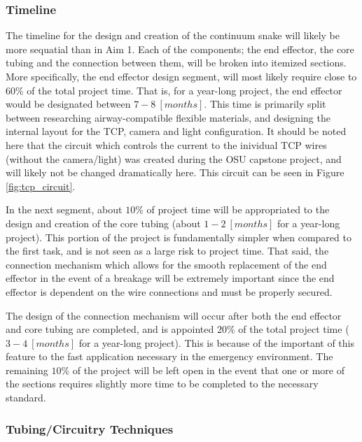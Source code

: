 	\subsubsection{Timeline}
	
		The timeline for the design and creation of the continuum snake will likely be more sequatial than in Aim 1. Each of the components; the end effector, the core tubing and the connection between them, will be broken into itemized sections. More specifically, the end effector design segment, will most likely require close to $60\%$ of the total project time. That is, for a year-long project, the end effector would be designated between $7-8\ [months]$. This time is primarily split between researching airway-compatible flexible materials, and designing the internal layout for the TCP, camera and light configuration. It should be noted here that the circuit which controls the current to the inividual TCP wires (without the camera/light) was created during the OSU capstone project, and will likely not be changed dramatically here. This circuit can be seen in Figure \ref{fig:tcp_circuit}.
		
		In the next segment, about $10\%$ of project time will be appropriated to the design and creation of the core tubing (about $1-2\ [months]$ for a year-long project). This portion of the project is fundamentally simpler when compared to the first task, and is not seen as a large risk to project time. That said, the connection mechanism which allows for the smooth replacement of the end effector in the event of a breakage will be extremely important since the end effector is dependent on the wire connections and must be properly secured.
		
		The design of the connection mechanism will occur after both the end effector and core tubing are completed, and is appointed $20\%$ of the total project time ($3-4\ [months]$ for a year-long project). This is because of the important of this feature to the fast application necessary in the emergency environment. The remaining $10\%$ of the project will be left open in the event that one or more of the sections requires slightly more time to be completed to the necessary standard.
	
	\subsubsection{Tubing/Circuitry Techniques}

